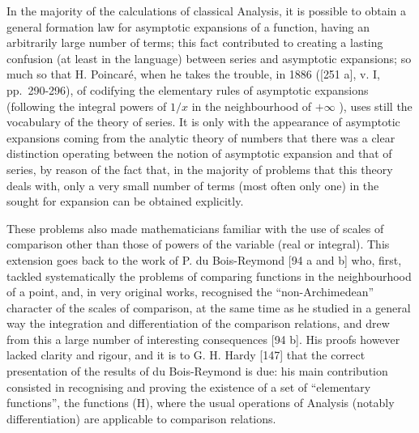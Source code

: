 In the majority of the calculations of classical Analysis, it is possible to obtain a general formation law for asymptotic expansions of a function, having an arbitrarily large number of terms; this fact contributed to creating a lasting confusion (at least in the language) between series and asymptotic expansions; so much so that H. Poincaré, when he takes the trouble, in 1886 ({[}251 a{]}, v. I, pp.~290-296), of codifying the elementary rules of asymptotic expansions (following the integral powers of \(1/x\) in the neighbourhood of \(+\infty\) ), uses still the vocabulary of the theory of series. It is only with the appearance of asymptotic expansions coming from the analytic theory of numbers that there was a clear distinction operating between the notion of asymptotic expansion and that of series, by reason of the fact that, in the majority of problems that this theory deals with, only a very small number of terms (most often only one) in the sought for expansion can be obtained explicitly.

These problems also made mathematicians familiar with the use of scales of comparison other than those of powers of the variable (real or integral). This extension goes back to the work of P. du Bois-Reymond {[}94 a and b{]} who, first, tackled systematically the problems of comparing functions in the neighbourhood of a point, and, in very original works, recognised the ``non-Archimedean'' character of the scales of comparison, at the same time as he studied in a general way the integration and differentiation of the comparison relations, and drew from this a large number of interesting consequences {[}94 b{]}. His proofs however lacked clarity and rigour, and it is to G. H. Hardy {[}147{]} that the correct presentation of the results of du Bois-Reymond is due: his main contribution consisted in recognising and proving the existence of a set of ``elementary functions'', the functions (H), where the usual operations of Analysis (notably differentiation) are applicable to comparison relations.

